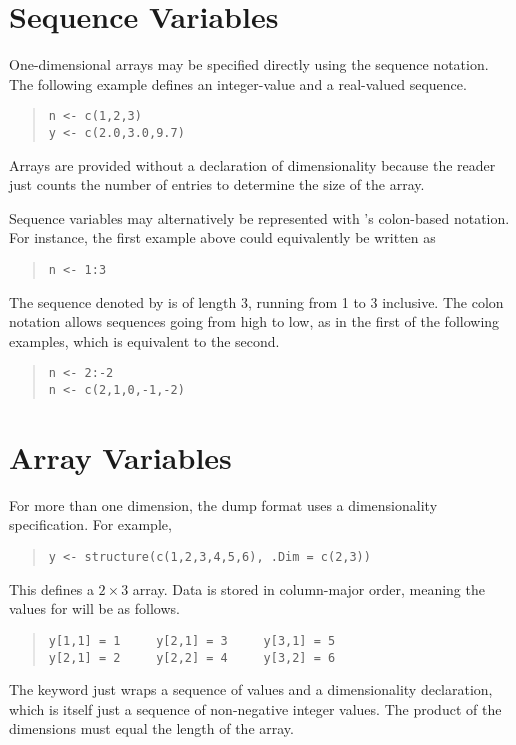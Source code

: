 \section{Sequence Variables}

One-dimensional arrays may be specified directly using the \SPLUS
sequence notation.  The following example defines an integer-value and
a real-valued sequence.
%
\begin{quote}
\begin{Verbatim}
n <- c(1,2,3)
y <- c(2.0,3.0,9.7)
\end{Verbatim}
\end{quote}
%
Arrays are provided without a declaration of dimensionality because
the reader just counts the number of entries to determine the size of
the array.

Sequence variables may alternatively be represented with \R's
colon-based notation.  For instance, the first example above could
equivalently be written as
%
\begin{quote}
\begin{Verbatim} 
n <- 1:3
\end{Verbatim}
\end{quote}
% 
The sequence denoted by  is of length 3, running from 1 to 3
inclusive.  The colon notation allows sequences going from high to
low, as in the first of the following examples, which is equivalent to
the second.
%
\begin{quote}
\begin{Verbatim}
n <- 2:-2
n <- c(2,1,0,-1,-2)
\end{Verbatim}
\end{quote}
%


\section{Array Variables}

For more than one dimension, the dump format uses a dimensionality
specification.  For example,
%
\begin{quote}
\begin{verbatim}
y <- structure(c(1,2,3,4,5,6), .Dim = c(2,3))
\end{verbatim}
\end{quote}
%
This defines a $2 \times 3$ array.  Data is stored in column-major
order, meaning the values for  will be as follows.
%
\begin{quote}
\begin{Verbatim}
y[1,1] = 1     y[2,1] = 3     y[3,1] = 5    
y[2,1] = 2     y[2,2] = 4     y[3,2] = 6
\end{Verbatim}
\end{quote}
%
The  keyword just wraps a sequence of values and a
dimensionality declaration, which is itself just a sequence of
non-negative integer values.  The product of the dimensions must equal
the length of the array.

